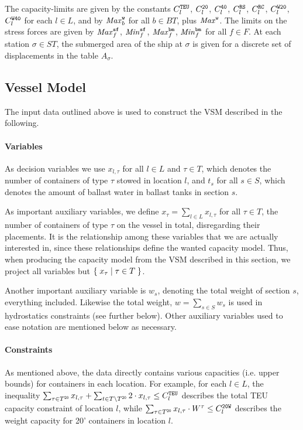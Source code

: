 The capacity-limits are given by the constants $C^{\texttt{TEU}}_l$, $C^{\texttt{20}}_l$, $C^{\texttt{40}}_l$, $C^{\texttt{RS}}_l$, $C^{\texttt{RC}}_l$, $C^{\texttt{W20}}_l$, $C^{\texttt{W40}}_l$ for each $l\in L$, and by $\mathit{Max}^{\texttt{w}}_b$ for all $b\in BT$, plus $\mathit{Max}^{\texttt{w}}$. The limits on the stress forces are given by $\mathit{Max}^{\texttt{sf}}_f$, $\mathit{Min}^{\texttt{sf}}_f$, $\mathit{Max}^{\texttt{bm}}_f$, $\mathit{Min}^{\texttt{bm}}_f$ for all $f\in F$. At each station $\sigma\in ST$, the submerged area of the ship at $\sigma$ is given for a discrete set of displacements in the table $A_\sigma$.

\subsection{Vessel Model}
The input data outlined above is used to construct the VSM described in the following.

\paragraph{Variables}
As decision variables we use $x_{l,\tau}$ for all $l\in L$ and $\tau \in T$, which denotes the number of containers of type $\tau$ stowed in location $l$, and $t_s$ for all $s\in S$, which denotes the amount of ballast water in ballast tanks in section $s$. 

As important auxiliary variables, we define $x_\tau = \sum_{l\in L} x_{l,\tau}$ for all $\tau\in T$, the number of containers of type $\tau$ on the vessel in total, disregarding their placements. It is the relationship among these variables that we are actually interested in, since these relationships define the wanted capacity model. Thus, when producing the capacity model from the VSM described in this section, we project all variables but $\{\;{x_\tau}\;|\;{\tau \in T}\;\}$.  

Another important auxiliary variable is $w_s$, denoting the total weight of section $s$, everything included. Likewise the total weight, $w = \sum_{s\in S}w_s$ is used in hydrostatics constraints (see further below). 
Other auxiliary variables used to ease notation are mentioned below as necessary.

\paragraph{Constraints}
As mentioned above, the data directly contains various capacities (i.e. upper bounds) for containers in each location. For example, for each $l\in L$, the inequality $\sum_{\tau \in T^{\texttt{20}}}x_{l,\tau} + \sum_{t\in T\setminus T^{\texttt{20}}}2\cdot x_{l,\tau}\leq C^{\texttt{TEU}}_l$  describes the total TEU capacity constraint of location $l$, while $\sum_{\tau \in T^{\texttt{20}}}x_{l,\tau}\cdot W^\tau\leq C^{\texttt{20W}}_l$ describes the weight capacity for 20' containers in location $l$.

